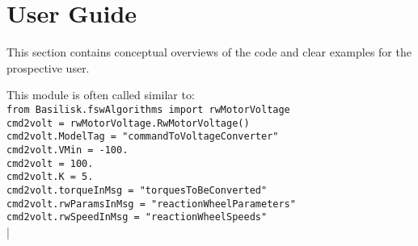 \section{User Guide}
This section contains conceptual overviews of the code and clear examples for the prospective user. 

This module is often called similar to:\\
\verb|from Basilisk.fswAlgorithms import rwMotorVoltage|\\
\verb|cmd2volt = rwMotorVoltage.RwMotorVoltage()|\\
\verb|cmd2volt.ModelTag = "commandToVoltageConverter"|\\
\verb|cmd2volt.VMin = -100.|\\
\verb|cmd2volt = 100.|\\
\verb|cmd2volt.K = 5.|\\
\verb|cmd2volt.torqueInMsg = "torquesToBeConverted"|\\
\verb|cmd2volt.rwParamsInMsg = "reactionWheelParameters"|\\
\verb|cmd2volt.rwSpeedInMsg = "reactionWheelSpeeds"|\\


|
